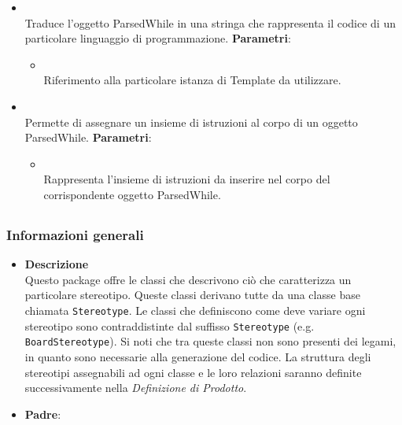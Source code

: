 \begin{itemize}
\begin{itemize}
\begin{itemize}
\end{itemize}
\item {}
\\ Traduce l'oggetto ParsedWhile in una stringa che rappresenta il codice di un particolare linguaggio di programmazione.
\textbf{Parametri}:
\begin{itemize}
\item {}
\\ Riferimento alla particolare istanza di Template da utilizzare.
\end{itemize}
\item {}
\\ Permette di assegnare un insieme di istruzioni al corpo di un oggetto ParsedWhile.
\textbf{Parametri}:
\begin{itemize}
\item {}
\\ Rappresenta l'insieme di istruzioni da inserire nel corpo del corrispondente oggetto ParsedWhile.
\end{itemize}
\end{itemize}
\end{itemize}
\subsection{}
\label{\nogloxy{swedesigner::server::stereotype}}
\subsubsection{Informazioni generali}
\begin{itemize}
\item \textbf{Descrizione}\\
Questo package offre le classi che descrivono ciò che caratterizza un particolare stereotipo. Queste classi derivano tutte da una classe base chiamata \texttt{Stereotype}. Le classi che definiscono come deve variare ogni stereotipo sono contraddistinte dal suffisso \texttt{Stereotype} (e.g. \texttt{BoardStereotype}). Si noti che tra queste classi non sono presenti dei legami, in quanto sono necessarie alla generazione del codice. La struttura degli stereotipi assegnabili ad ogni classe e le loro relazioni saranno definite successivamente nella \emph{Definizione di Prodotto}.
\item \textbf{Padre}: \hyperref[\nogloxy{swedesigner::server}]{}
\end{itemize}

